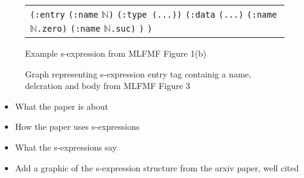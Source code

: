 \begin{figure}[H]
  \centering
  \begin{tabular}{p{5cm}}
    \texttt{(:entry}\newline
    \hphantom{oo}\texttt{(:name} $\mathbb{N}$\texttt{)}\newline
    \hphantom{oo}\texttt{(:type (...))}\newline
    \hphantom{oo}\texttt{(:data}\newline
    \hphantom{oooo}\texttt{(...)}\newline
    \hphantom{oooo}\texttt{(:name} $\mathbb{N}$\texttt{.zero)}\newline
    \hphantom{oooo}\texttt{(:name} $\mathbb{N}$\texttt{.suc)}\newline
    \hphantom{oo}\texttt{)}\newline
    \texttt{)}
  \end{tabular}
  \caption{Example s-expression from MLFMF Figure 1(b) \cite{bauer2023mlfmf}}
  \label{fig:example-sexp}
\end{figure}

\begin{figure}[H]
  \centering
  \caption{Graph representing s-expression entry tag containig a name,
  delcration and body from MLFMF Figure 3 \cite{bauer2023mlfmf}}
  \label{fig:sexp-ast}
\end{figure}

\begin{itemize}
\item What the paper is about 
\item How the paper uses s-expressions 
\item What the s-expressions say 
\item Add a graphic of the s-expression structure from the arxiv paper, well cited
\end{itemize}

